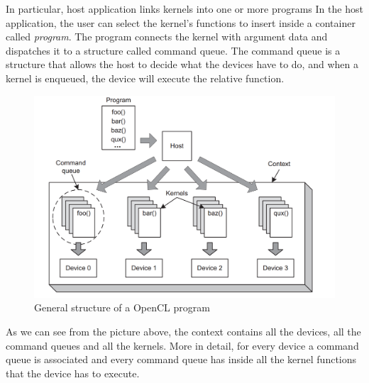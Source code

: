 In particular, host application links kernels into one or more programs In the host application, the user can select the kernel's functions to insert inside a container called \emph{program}.  The program connects the kernel with argument data and dispatches it to a structure called command queue.  The command queue is a structure that allows the host to decide what the devices have to do, and when a kernel is enqueued, the device will execute the relative function.

\begin{figure}[htp]
  \begin{center}
    \includegraphics[width=12cm]{./images/OpenCAL-CL/kernelDistribution}
    \caption{General structure of a OpenCL program}
    \label{fig:GeneralStructure}
  \end{center}
\end{figure}

As we can see from the picture above, the context contains all the devices, all the command queues and all the kernels.
More in detail, for every device a command queue is associated and every command queue has inside all the kernel functions
that the device has to execute.

